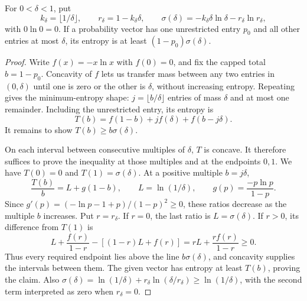 \begin{lemma}
\label{lem:capped-discovery-entropy}
For $0<\delta<1$, put
\[
 k_\delta=\lfloor1/\delta\rfloor,\qquad
 r_\delta=1-k_\delta\delta,\qquad
 \sigma(\delta)=-k_\delta\delta\ln\delta-r_\delta\ln r_\delta,
\]
with $0\ln0=0$.
If a probability vector has one unrestricted entry $p_0$ and
all other entries at most $\delta$, its entropy is at least
$(1-p_0)\sigma(\delta)$.
\end{lemma}
\begin{proof}
Write $f(x)=-x\ln x$ with $f(0)=0$, and fix the capped total
$b=1-p_0$. Concavity of $f$ lets us transfer mass between any two
entries in $(0,\delta)$ until one is zero or the other is $\delta$,
without increasing entropy. Repeating gives the minimum-entropy shape:
$j=\lfloor b/\delta\rfloor$ entries of mass $\delta$ and at most
one remainder. Including the unrestricted entry, its entropy is
\[
 T(b)=f(1-b)+j f(\delta)+f(b-j\delta).
\]
It remains to show $T(b)\ge b\sigma(\delta)$.

On each interval between consecutive multiples of $\delta$, $T$ is
concave. It therefore suffices to prove the inequality at those
multiples and at the endpoints $0,1$. We have $T(0)=0$ and
$T(1)=\sigma(\delta)$. At a positive multiple $b=j\delta$,
\[
 \frac{T(b)}b=L+g(1-b),\qquad
 L=\ln(1/\delta),\qquad
 g(p)=\frac{-p\ln p}{1-p}.
\]
Since
$g'(p)=(-\ln p-1+p)/(1-p)^2\ge0$, these ratios decrease as the
multiple $b$ increases. Put $r=r_\delta$. If $r=0$, the last ratio
is $L=\sigma(\delta)$. If $r>0$, its difference from $T(1)$ is
\[
 L+\frac{f(r)}{1-r}-[(1-r)L+f(r)]
 =rL+\frac{r f(r)}{1-r}\ge0.
\]
Thus every required endpoint lies above the line
$b\sigma(\delta)$, and concavity supplies the intervals between them.
The given vector has entropy at least $T(b)$, proving the claim.
Also $\sigma(\delta)=\ln(1/\delta)+r_\delta
\ln(\delta/r_\delta)\ge\ln(1/\delta)$, with the second term
interpreted as zero when $r_\delta=0$.
\end{proof}


